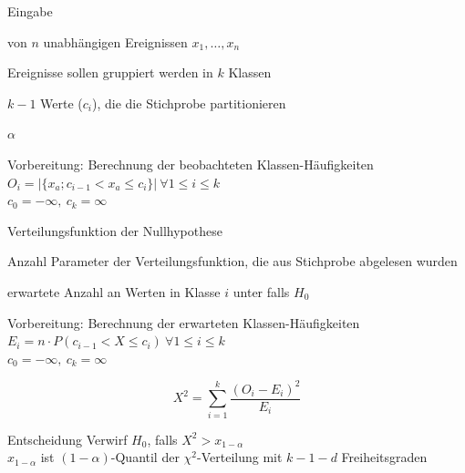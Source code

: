 \documentclass{beamer}
\begin{document}
\begin{frame}{\insertsubsection}
\begin{block}{Eingabe}
	\begin{description}[Signifikanzniveau]
	\item[Zufallsstichprobe] von $n$ unabhängigen Ereignissen $x_1, \ldots, x_n$
	\item[Klassenanzahl] Ereignisse sollen gruppiert werden in $k$ Klassen
	\item[Klassengrenzen] $k-1$ Werte ($c_i$), die die Stichprobe partitionieren
	\item[Signifikanzniveau] $\alpha$
	\end{description}
\end{block}
\begin{block}{Vorbereitung: Berechnung der beobachteten Klassen-Häufigkeiten}
	$O_i = \left|\{ x_a ; c_{i-1} < x_a \leq c_i \}\right| ~ \forall 1 \leq i \leq k$
	\\
	$c_0 = -\infty, ~ c_k = \infty$
\end{block}
\end{frame}

\begin{frame}{\insertsubsection}
\begin{definition}
	\begin{description}[$E_i$]
	\item[$F$] Verteilungsfunktion der Nullhypothese
	\item[$d$] Anzahl Parameter der Verteilungsfunktion, die aus Stichprobe abgelesen wurden
	\item[$E_i$] erwartete Anzahl an Werten in Klasse $i$ unter falls $H_0$
	\end{description}
\end{definition}
\begin{block}{Vorbereitung: Berechnung der erwarteten Klassen-Häufigkeiten}
	$E_i = n \cdot P(c_{i-1} < X \leq c_i) ~ \forall 1 \leq i \leq k$
	\\
	$c_0 = -\infty, ~ c_k = \infty$
\end{block}
\end{frame}

\begin{frame}{\insertsubsection}
\begin{definition}[Teststatistik]
	\begin{equation*}
		X^2 = \sum_{i=1}^{k}\frac{(O_i - E_i)^2}{E_i}
	\end{equation*}
\end{definition}
\begin{block}{Entscheidung}
	Verwirf $H_0$, falls $X^2 > x_{1-\alpha}$ \\[1ex]
	$x_{1-\alpha}$ ist $(1-\alpha)$-Quantil der $\chi^2$-Verteilung mit $k-1-d$ Freiheitsgraden
\end{block}
\end{frame}
\end{document}
